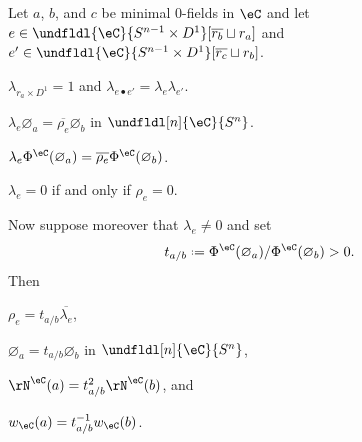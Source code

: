\documentclass[12pt,reqno]{amsart}
\newcommand{\psn}{\Phi}
\newcommand{\C}{\eC}
\newcommand{\blt}{\bullet}
\newcommand{\fcj}[1]{\overline{#1}}
\renewcommand{\amalg}{\sqcup}
\DeclareRobustCommand{\coloneq}{\mathrel{\vcenter{\baselineskip0.5ex\lineskiplimit0pt\hbox{\scriptsize{\upshape.}}\hbox{\scriptsize{\upshape.}}}}=}
\begin{document}
\begin{lemma}
	\label{lem:lambda-rho}
	Let $a$, $b$, and $c$ be minimal 0-fields in $\C$ and let $e\in\undfldl{\C}{S^{n-1}\times D^1}[\fcj{r_b}\amalg r_a]$ and $e'\in\undfldl{\C}{S^{n-1}\times D^1}[\fcj{r_c}\amalg r_b]$.
	\begin{lst}
		\item\label{lr1} $\lambda_{r_a\times D^1}=1$ and $\lambda_{e\blt e'}=\lambda_{e}\lambda_{e'}$.
		\item\label{lr2} $\lambda_e\varnothing_a=\overline{\rho_e}\varnothing_b$ in $\undfldl[n]{\C}{S^n}$. 
        \item\label{lr15} $\lambda_e\psn^\C(\varnothing_a)=\overline{\rho_e}\psn^\C(\varnothing_b)$.
        \item\label{lr4} $\lambda_e=0$ if and only if $\rho_e=0$.
        \end{lst} 
        Now suppose moreover that $\lambda_e\neq0$ and set
        \[
        t_{a/b}\coloneq\psn^\C(\varnothing_a)/\psn^\C(\varnothing_b)>0.
        \]
        Then
        \begin{lst}[resume]
        \item\label{lr8} $\rho_e=t_{a/b}\overline{\lambda_e}$, 
        \item\label{lr5} $\varnothing_a=t_{a/b}\varnothing_b$ in $\undfldl[n]{\C}{S^n}$,
        \item\label{lr6} $\rN^\C(a)=t_{a/b}^2\rN^\C(b)$, and
        \item\label{lr7} $w_\C(a)=t_{a/b}^{-1}w_\C(b)$.
	\end{lst}
\end{lemma}
\end{document}
